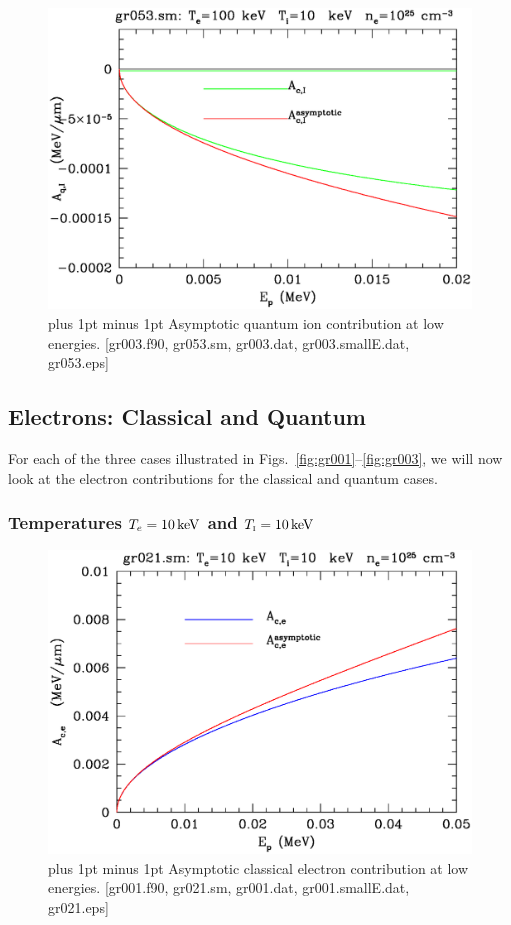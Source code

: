 \documentclass[preprint,12pt,eqsecnum,nofootinbib,amsmath,amssymb]{revtex4}
\newcommand{\smI}{{\rm\scriptscriptstyle I}}
\newcommand{\footnoteskip}{\baselineskip 12pt plus 1pt minus 1pt}
\begin{document}
\vskip-2cm 
\begin{figure}[h!]
\includegraphics[scale=0.45]{gr053.eps} 
\vskip-0.8cm 
\caption{\footnoteskip  
  Asymptotic quantum ion contribution at low energies. [gr003.f90,
  gr053.sm, gr003.dat, gr003.smallE.dat, gr053.eps]
}
\label{fig:gr053}
\end{figure}


\pagebreak
\subsection{Electrons: Classical and Quantum}

For each of the three cases illustrated in
Figs.~\ref{fig:gr001}--\ref{fig:gr003}, we will now look at the
electron contributions for the classical and quantum cases.

\subsubsection{Temperatures $T_e=10\,{\rm keV}$ and $T_\smI=10\,{\rm keV}$}

\vskip-2cm 
\begin{figure}[h!]
\includegraphics[scale=0.45]{gr021.eps} 
\vskip-0.8cm 
\caption{\footnoteskip  
  Asymptotic classical electron contribution at low
  energies. [gr001.f90, gr021.sm, gr001.dat, gr001.smallE.dat,
  gr021.eps]
}
\label{fig:gr021}
\end{figure}
\end{document}
